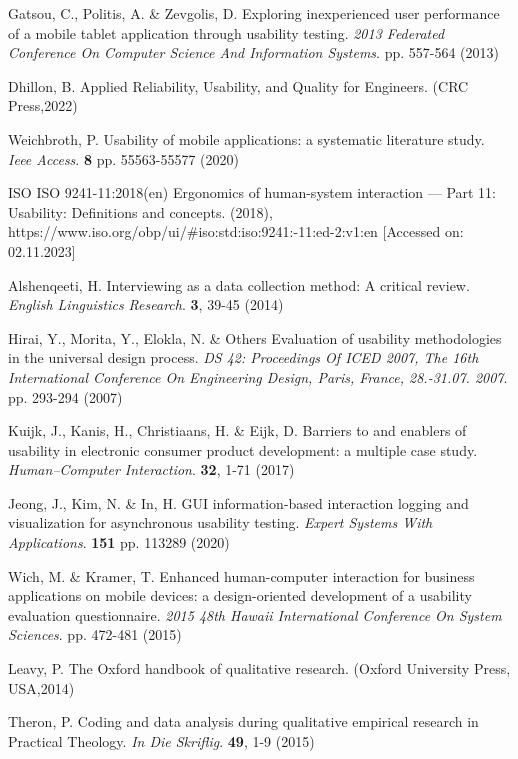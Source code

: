 \documentclass[preprint,12pt,number]{elsarticle}
\begin{document}
\begin{thebibliography}{00}
Gatsou, C., Politis, A. \& Zevgolis, D. Exploring inexperienced user performance of a mobile tablet application through usability testing. {\em 2013 Federated Conference On Computer Science And Information Systems}. pp. 557-564 (2013)

Dhillon, B. Applied Reliability, Usability, and Quality for Engineers. (CRC Press,2022)

Weichbroth, P. Usability of mobile applications: a systematic literature study. {\em Ieee Access}. \textbf{8} pp. 55563-55577 (2020)

ISO ISO 9241-11:2018(en) Ergonomics of human-system interaction — Part 11: Usability: Definitions and concepts.  (2018), https://www.iso.org/obp/ui/\#iso:std:iso:9241:-11:ed-2:v1:en [Accessed on: 02.11.2023]

Alshenqeeti, H. Interviewing as a data collection method: A critical review. {\em English Linguistics Research}. \textbf{3}, 39-45 (2014)

Hirai, Y., Morita, Y., Elokla, N. \& Others Evaluation of usability methodologies in the universal design process. {\em DS 42: Proceedings Of ICED 2007, The 16th International Conference On Engineering Design, Paris, France, 28.-31.07. 2007}. pp. 293-294 (2007)

Kuijk, J., Kanis, H., Christiaans, H. \& Eijk, D. Barriers to and enablers of usability in electronic consumer product development: a multiple case study. {\em Human–Computer Interaction}. \textbf{32}, 1-71 (2017)

Jeong, J., Kim, N. \& In, H. GUI information-based interaction logging and visualization for asynchronous usability testing. {\em Expert Systems With Applications}. \textbf{151} pp. 113289 (2020)

Wich, M. \& Kramer, T. Enhanced human-computer interaction for business applications on mobile devices: a design-oriented development of a usability evaluation questionnaire. {\em 2015 48th Hawaii International Conference On System Sciences}. pp. 472-481 (2015)

Leavy, P. The Oxford handbook of qualitative research. (Oxford University Press, USA,2014)

Theron, P. Coding and data analysis during qualitative empirical research in Practical Theology. {\em In Die Skriflig}. \textbf{49}, 1-9 (2015)


\end{thebibliography}
\end{document}
